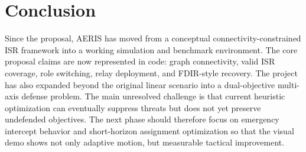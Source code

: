\documentclass[conference]{IEEEtran}
\begin{document}
\section{Conclusion}
Since the proposal, AERIS has moved from a conceptual connectivity-constrained
ISR framework into a working simulation and benchmark environment. The core
proposal claims are now represented in code: graph connectivity, valid ISR
coverage, role switching, relay deployment, and FDIR-style recovery. The project
has also expanded beyond the original linear scenario into a dual-objective
multi-axis defense problem. The main unresolved challenge is that current
heuristic optimization can eventually suppress threats but does not yet preserve
undefended objectives. The next phase should therefore focus on emergency
intercept behavior and short-horizon assignment optimization so that the visual
demo shows not only adaptive motion, but measurable tactical improvement.
\end{document}
